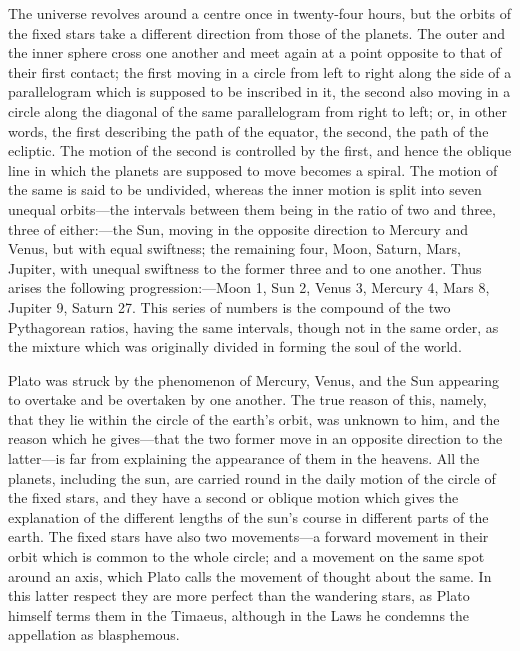 The universe revolves around a centre once in twenty-four hours, but the
orbits of the fixed stars take a different direction from those of the
planets. The outer and the inner sphere cross one another and meet again
at a point opposite to that of their first contact; the first moving in a
circle from left to right along the side of a parallelogram which is
supposed to be inscribed in it, the second also moving in a circle along
the diagonal of the same parallelogram from right to left; or, in other
words, the first describing the path of the equator, the second, the path
of the ecliptic. The motion of the second is controlled by the first, and
hence the oblique line in which the planets are supposed to move becomes a
spiral. The motion of the same is said to be undivided, whereas the inner
motion is split into seven unequal orbits—the intervals between them
being in the ratio of two and three, three of either:—the Sun,
moving in the opposite direction to Mercury and Venus, but with equal
swiftness; the remaining four, Moon, Saturn, Mars, Jupiter, with unequal
swiftness to the former three and to one another. Thus arises the
following progression:—Moon 1, Sun 2, Venus 3, Mercury 4, Mars 8,
Jupiter 9, Saturn 27. This series of numbers is the compound of the two
Pythagorean ratios, having the same intervals, though not in the same
order, as the mixture which was originally divided in forming the soul of
the world.

Plato was struck by the phenomenon of Mercury, Venus, and the Sun
appearing to overtake and be overtaken by one another. The true reason of
this, namely, that they lie within the circle of the earth’s orbit, was
unknown to him, and the reason which he gives—that the two former
move in an opposite direction to the latter—is far from explaining
the appearance of them in the heavens. All the planets, including the sun,
are carried round in the daily motion of the circle of the fixed stars,
and they have a second or oblique motion which gives the explanation of
the different lengths of the sun’s course in different parts of the earth.
The fixed stars have also two movements—a forward movement in their
orbit which is common to the whole circle; and a movement on the same spot
around an axis, which Plato calls the movement of thought about the same.
In this latter respect they are more perfect than the wandering stars, as
Plato himself terms them in the Timaeus, although in the Laws he condemns
the appellation as blasphemous.

